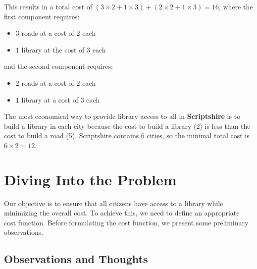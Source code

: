 \documentclass[11pt, a4paper, oneside]{article}
\begin{document}
This results in a total cost of \((3 \times 2 + 1 \times 3) + (2 \times 2 + 1 \times 3) = 16\), where the first component requires:

\begin{itemize}
  \item \(3\) roads at a cost of \(2\) each
  \item \(1\) library at the cost of \(3\) each
\end{itemize} 

and the second component requires:

\begin{itemize}
  \item \(2\) roads at a cost of \(2\) each
  \item \(1\) library at a cost of \(3\) each
\end{itemize}

The most economical way to provide library access to all in \textbf{Scriptshire} is to build a library in each city because the cost to build a library (2) is less than the cost to build a road (5). Scriptshire contains 6 cities, so the minimal total cost is \(6 \times 2 = 12\).

\section*{Diving Into the Problem}

Our objective is to ensure that all citizens have access to a library while minimizing the overall cost. To achieve this, we need to define an appropriate cost function. Before formulating the cost function, we present some preliminary observations.

\subsection*{Observations and Thoughts}
\end{document}

